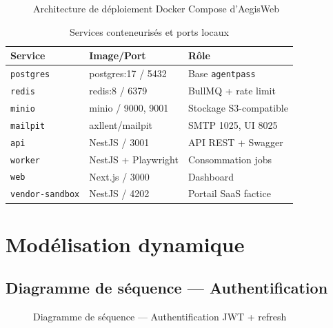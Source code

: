 \begin{figure}[H]
\centering
{}
\caption{Architecture de déploiement Docker Compose d'AegisWeb}
\label{fig:archi_deploy}
\end{figure}

\begin{table}[H]
\centering
\caption{Services conteneurisés et ports locaux}
\label{tab:docker}
\begin{tabularx}{\textwidth}{@{}p{2.2cm}p{3.2cm}X@{}}
\toprule
\textbf{Service} & \textbf{Image/Port}     & \textbf{Rôle} \\
\midrule
\rowcolor{rowgray}
\texttt{postgres} & postgres:17 / 5432   & Base \texttt{agentpass} \\
\texttt{redis}    & redis:8 / 6379       & BullMQ + rate limit \\
\rowcolor{rowgray}
\texttt{minio}    & minio / 9000, 9001   & Stockage S3-compatible \\
\texttt{mailpit}  & axllent/mailpit      & SMTP 1025, UI 8025 \\
\rowcolor{rowgray}
\texttt{api}      & NestJS / 3001        & API REST + Swagger \\
\texttt{worker}  & NestJS + Playwright  & Consommation jobs \\
\rowcolor{rowgray}
\texttt{web}      & Next.js / 3000       & Dashboard \\
\texttt{vendor-sandbox} & NestJS / 4202 & Portail SaaS factice \\
\bottomrule
\end{tabularx}
\end{table}

\section{Modélisation dynamique}

\subsection{Diagramme de séquence — Authentification}

\begin{figure}[H]
\centering
{}
\caption{Diagramme de séquence — Authentification JWT + refresh}
\label{fig:seq_auth}
\end{figure}

